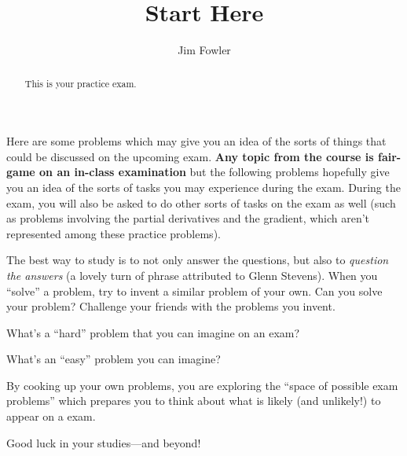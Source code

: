 \documentclass{ximera}
\author{Jim Fowler}
\title{Start Here}
\begin{document}
\begin{abstract}
  This is your practice exam.
\end{abstract}

\maketitle

Here are some problems which may give you an idea of the sorts of
things that could be discussed on the upcoming exam.  \textbf{Any
  topic from the course is fair-game on an in-class examination} but
the following problems hopefully give you an idea of the sorts of
tasks you may experience during the exam.  During the exam, you
will also be asked to do other sorts of tasks on the exam as well
(such as problems involving the partial derivatives and the gradient,
which aren't represented among these practice problems).

The best way to study is to not only answer the questions, but also to
\textit{question the answers} (a lovely turn of phrase attributed to
Glenn Stevens).  When you ``solve'' a problem, try to invent a similar
problem of your own.  Can you solve your problem?  Challenge your
friends with the problems you invent.

What's a ``hard'' problem that you can imagine on an exam?
\begin{freeResponse}
\end{freeResponse}

What's an ``easy'' problem you can imagine?
\begin{freeResponse}
\end{freeResponse}

By cooking up your own problems, you are exploring the ``space of
possible exam problems'' which prepares you to think about what is
likely (and unlikely!) to appear on a exam.

Good luck in your studies---and beyond!
\end{document}
